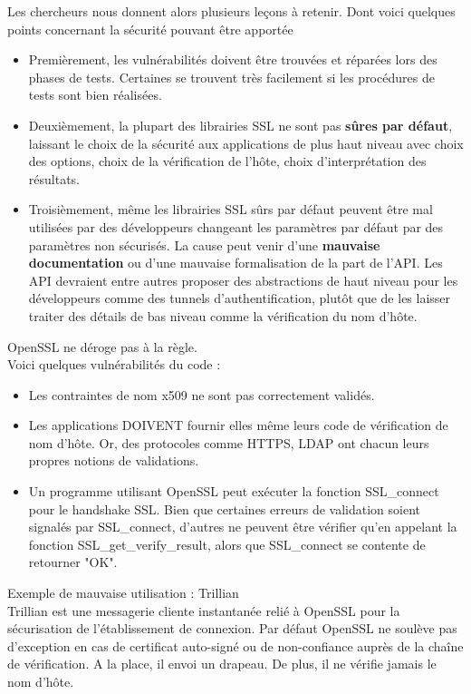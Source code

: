 			Les chercheurs nous donnent alors plusieurs leçons à retenir.
			Dont voici quelques points concernant la sécurité pouvant être
			apportée\\
			\begin{itemize}
			\item Premièrement, les vulnérabilités doivent être trouvées
			et réparées lors des phases de tests. Certaines se trouvent 
			très facilement si les procédures de tests sont bien réalisées.
			\item Deuxièmement, la plupart des librairies SSL ne sont pas
			\textbf{sûres par défaut}, laissant le choix de la sécurité aux 
			applications de plus haut niveau avec choix des options,
			choix de la vérification de l'hôte, choix d'interprétation
			des résultats.
			\item Troisièmement, même les librairies SSL sûrs par défaut
			peuvent être mal utilisées par des développeurs changeant les
			paramètres par défaut par des paramètres non sécurisés. La 
			cause peut venir d'une \textbf{mauvaise documentation} 
			ou d'une mauvaise formalisation de la part de l'API. 
			Les API devraient entre autres proposer des abstractions de 
			haut niveau pour les développeurs comme des tunnels
			d'authentification, plutôt que de les laisser traiter 
			des détails de bas niveau comme la vérification du nom d'hôte.\\
			\end{itemize}
			
			OpenSSL ne déroge pas à la règle.\\
			Voici quelques vulnérabilités du code :
			\begin{itemize}
			\item Les contraintes de nom x509 ne sont pas correctement validés.
			\item Les applications DOIVENT fournir elles même leurs code de
			vérification de nom d'hôte. Or, des protocoles comme HTTPS, LDAP
			ont chacun leurs propres notions de validations.
			\item Un programme utilisant OpenSSL peut exécuter la fonction
			SSL\_connect pour le handshake SSL. Bien que certaines erreurs de
			validation soient signalés par SSL\_connect, d'autres ne peuvent
			être vérifier qu'en appelant la fonction SSL\_get\_verify\_result,
			alors que SSL\_connect se contente de retourner "OK".
			\end{itemize}
			
			Exemple de mauvaise utilisation : Trillian\\
			Trillian est une messagerie cliente instantanée	relié à OpenSSL
			pour la sécurisation de l'établissement de connexion.
			Par défaut OpenSSL ne soulève pas d'exception en cas de certificat
			auto-signé ou de non-confiance auprès de la chaîne de vérification.
			A la place, il envoi un drapeau. De plus, il ne vérifie jamais le
			nom d'hôte.\\
			
